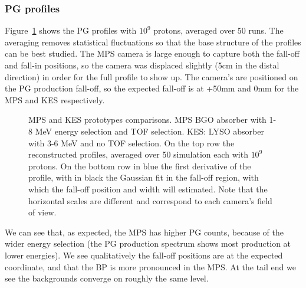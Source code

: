 \documentclass[a4paper,english,12pt]{article}
\begin{document}
\subsubsection{PG profiles}

Figure~\ref{fig:PGprofileProtoComp} shows the PG profiles with $10^9$ protons, averaged over 50 runs. The averaging removes statistical fluctuations so that the base structure of the profiles can be best studied. The MPS camera is large enough to capture both the fall-off and fall-in positions, so the camera was displaced slightly (5cm in the distal direction) in order for the full profile to show up. The camera's are positioned on the PG production fall-off, so the expected fall-off is at +50mm and 0mm for the MPS and KES respectively.

\begin{figure}[!htp]
  \centering
  \quad
  \caption{\label{fig:PGprofileProtoComp}MPS and KES prototypes comparisons. MPS BGO absorber with 1-8 MeV energy selection and TOF selection. KES: LYSO absorber with 3-6 MeV and no TOF selection. On the top row the reconstructed profiles, averaged over 50 simulation each with $10^9$ protons. On the bottom row in blue the first derivative of the profile, with in black the Gaussian fit in the fall-off region, with which the fall-off position and width will estimated. Note that the horizontal scales are different and correspond to each camera's field of view.}
\end{figure}  

We can see that, as expected, the MPS has higher PG counts, because of the wider energy selection (the PG production spectrum shows most production at lower energies). We see qualitatively the fall-off positions are at the expected coordinate, and that the BP is more pronounced in the MPS. At the tail end we see the backgrounds converge on roughly the same level. 
\end{document}
